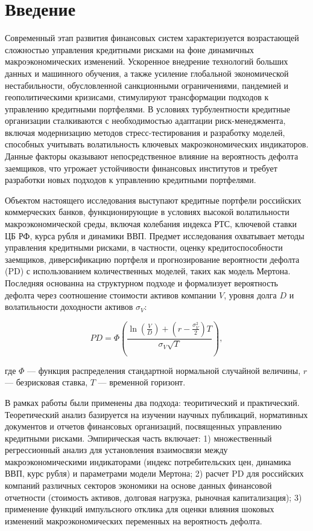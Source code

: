 \documentclass[]{article}
\begin{document}
	
	
	
	\newpage
	\tableofcontents
	
	\newpage
	\section{Введение}
		
	
	Современный этап развития финансовых систем характеризуется возрастающей сложностью управления кредитными рисками на фоне динамичных макроэкономических изменений. Ускоренное внедрение технологий больших данных и машинного обучения, а также усиление глобальной экономической нестабильности, обусловленной санкционными ограничениями, пандемией и геополитическими кризисами, стимулируют трансформации подходов к управлению кредитными портфелями. В условиях турбулентности кредитные организации сталкиваются с необходимостью адаптации риск-менеджмента, включая модернизацию методов стресс-тестирования и разработку моделей, способных учитывать волатильность ключевых макроэкономических индикаторов. Данные факторы оказывают непосредственное влияние на вероятность дефолта заемщиков, что угрожает устойчивости финансовых институтов и требует разработки новых подходов к управлению кредитными портфелями.  
	
	Объектом настоящего исследования выступают кредитные портфели российских коммерческих банков, функционирующие в условиях высокой волатильности макроэкономической среды, включая колебания индекса РТС, ключевой ставки ЦБ РФ, курса рубля и динамики ВВП. Предмет исследования охватывает методы управления кредитными рисками, в частности, оценку кредитоспособности заемщиков, диверсификацию портфеля и прогнозирование вероятности дефолта (PD) с использованием количественных моделей, таких как модель Мертона. Последняя основанна на структурном подходе и формализует вероятность дефолта через соотношение стоимости активов компании \( V \), уровня долга \( D \) и волатильности доходности активов \( \sigma_V \):  
	
	\[
	PD = \Phi\left( \frac{\ln\left(\frac{V}{D}\right) + \left(r - \frac{\sigma_V^2}{2}\right)T}{\sigma_V \sqrt{T}} \right),
	\]  
	
	где \( \Phi \) — функция распределения стандартной нормальной случайной величины, \( r \) — безрисковая ставка, \( T \) — временной горизонт.  
	
	В рамках работы были применены два подхода: теоритический и практический. Теоретический анализ базируется на изучении научных публикаций, нормативных документов и отчетов финансовых организаций, посвященных управлению кредитными рисками. Эмпирическая часть включает:  
	1) множественный регрессионный анализ для установления взаимосвязи между макроэкономическими индикаторами (индекс потребительских цен, динамика ВВП, курс рубля) и параметрами модели Мертона;  
	2) расчет PD для российских компаний различных секторов экономики на основе данных финансовой отчетности (стоимость активов, долговая нагрузка, рыночная капитализация);  
	3) применение функций импульсного отклика для оценки влияния шоковых изменений макроэкономических переменных на вероятность дефолта.  
	
\end{document}
